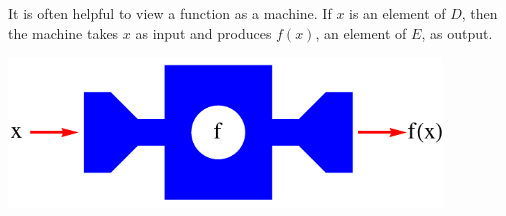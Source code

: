 \begin{frame}
It is often helpful to view a function as a machine.  If $x$ is an element of $D$, then the machine takes $x$ as input and produces $f(x)$, an element of $E$, as output.

\includegraphics[height=4cm]{precalculus/pictures/01-01-machine.pdf}
\end{frame}

